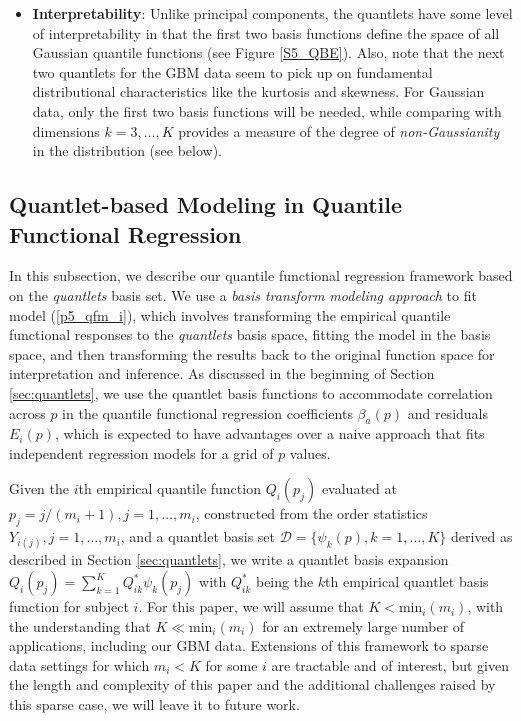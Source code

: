 \documentclass[11pt]{article}
\begin{document}
\begin{itemize}
\item \textbf{Interpretability}:  Unlike principal components, the quantlets have some level of interpretability in that the first two basis functions define the space of all Gaussian quantile functions (see Figure \ref{S5_QBE}).  Also, note that the next two quantlets for the GBM data seem to pick up on fundamental distributional characteristics like the kurtosis and skewness.
For Gaussian data, only the first two basis functions will be needed, while comparing with dimensions $k=3, \ldots, K$ provides a measure of the degree of \textit{non-Gaussianity} in the distribution (see below).
\end{itemize}

\subsection{ \bf{Quantlet-based Modeling in Quantile Functional Regression}}


In this subsection, we describe our quantile functional regression framework based on the  {\it quantlets} basis set.
 We use a \textit{basis transform modeling approach} to fit model (\ref{p5_qfm_i}), which involves
transforming the empirical quantile functional responses to the {\it quantlets} basis space, 
fitting the model in the basis space, and then transforming
the results back to the original function space for interpretation and inference.
 As discussed in the beginning of Section \ref{sec:quantlets}, we use the quantlet basis functions to accommodate correlation across $p$ in the quantile functional regression coefficients $\beta_a(p)$ and residuals $E_i(p)$, which is expected to have advantages over a naive approach that fits independent regression models for a grid of $p$ values.
 
Given the $i$th empirical quantile function $Q_i(p_j)$ evaluated at $p_j=j/(m_i+1), j=1,\ldots, m_i$, constructed from the order statistics $Y_{i(j)}, j=1,\ldots, m_i$, and a quantlet basis set $\mathcal{D}=\{\psi_k(p), k=1,\ldots,K\}$ derived as described in Section \ref{sec:quantlets}, we write a quantlet basis expansion $Q_i(p_j)=\sum_{k=1}^K Q^*_{ik} \psi_k(p_j)$ with $Q^*_{ik}$ being the $k$th empirical quantlet basis function for subject $i$.  For this paper, we will assume that $K<\text{min}_i(m_i)$, with the understanding that $K \ll \text{min}_i(m_i)$ for an extremely large number of applications, including our GBM data.  Extensions of this framework to sparse data settings for which $m_i<K$  for some $i$ are tractable and of interest, but given the length and complexity of this paper and the additional challenges raised by this sparse case, we will leave it to future work.
\end{document}
